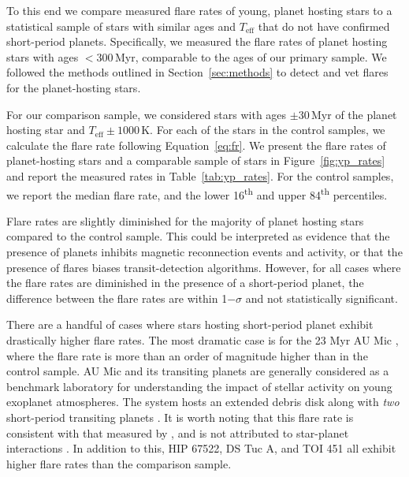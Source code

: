 \documentclass[twocolumn, linenumbers]{aastex631}
\begin{document}
To this end we compare  measured flare rates of young, planet hosting stars to a statistical sample of stars with similar ages and $T_\textrm{eff}$ that do not have confirmed short-period planets.
Specifically, we measured the flare rates of planet hosting stars with ages $< 300$\,Myr, comparable to the ages of our primary sample. We followed the methods outlined in Section~\ref{sec:methods}
to detect and vet flares for the planet-hosting stars.

For our comparison sample, we considered stars with ages $\pm 30$\,Myr of the planet hosting star and $T_\textrm{eff} \pm 1000$\,K. For each of the stars in the control samples, we calculate the
flare rate following Equation~\ref{eq:fr}. We present the flare rates of planet-hosting stars and a comparable sample of stars in Figure~\ref{fig:yp_rates} and report the measured rates in
Table~\ref{tab:yp_rates}. For the control samples, we report the median flare rate, and the lower 16\textsuperscript{th} and upper 84\textsuperscript{th} percentiles.

Flare rates are slightly diminished for the majority of planet hosting stars compared to the control sample. This could be interpreted as evidence that the presence of planets inhibits magnetic
reconnection events and activity, or that the presence of flares biases transit-detection algorithms. However, for all cases where the flare rates are diminished in the presence of a short-period
planet, the difference between the flare rates are within 1$-\sigma$ and not statistically significant.

There are a handful of cases where stars hosting short-period planet exhibit drastically higher flare rates. The most dramatic case is for the 23 Myr AU Mic \citep{jeffries05,malo14,Mamajek14},
where the flare rate is more than an order of magnitude higher than in the control sample.  AU Mic and its transiting planets are generally considered as a benchmark laboratory for understanding
the impact of stellar activity on young exoplanet atmospheres. The system hosts an  extended debris disk \citep{kalas04, liu04, metchev05} along with \textit{two} short-period transiting planets
\citep{plavchan20, martioli21, gilbert22}. It is worth noting that this flare rate is consistent with that measured by \citet{gilbert22, feinstein22_aumic}, and is not attributed to star-planet
interactions \citep{ilin22}. In addition to this, HIP 67522, DS Tuc A, and TOI 451 all exhibit higher flare rates than the comparison sample.
\end{document}

